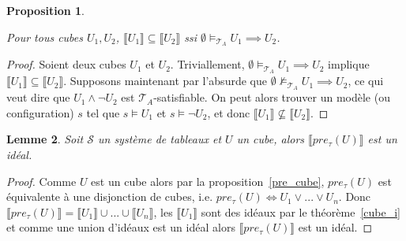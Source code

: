 \documentclass[a4paper, twoside]{scrartcl}
\theoremstyle{plain}%
\newtheorem{thm}{Théorème}[section]
\newtheorem{lem}[thm]{Lemme}
\newtheorem{prop}[thm]{Proposition}
\theoremstyle{definition}
\theoremstyle{remark}
\begin{document}
\begin{prop} \label{cube_incl} 

  Pour tous cubes $U_1, U_2$, $\llbracket U_1 \rrbracket \subseteq
  \llbracket U_2 \rrbracket$ ssi $\emptyset \vDash_{\mathcal{T}_A} U_1
  \implies U_2$.

\end{prop}


\begin{proof}

  Soient deux cubes $U_1$ et $U_2$. Triviallement, $\emptyset
  \vDash_{\mathcal{T}_A} U_1 \implies U_2$ implique $\llbracket U_1
  \rrbracket \subseteq \llbracket U_2 \rrbracket$. Supposons
  maintenant par l'absurde que $\emptyset \not \vDash_{\mathcal{T}_A} U_1
  \implies U_2$, ce qui veut dire que $U_1 \land \neg U_2$ est
  $\mathcal{T}_A$-satisfiable. On peut alors trouver un modèle (ou
  configuration) $s$ tel que $s \vDash U_1$ et $s \vDash \neg U_2$,
  et donc $\llbracket U_1 \rrbracket \not \subseteq \llbracket U_2
  \rrbracket$.

\end{proof}


\begin{lem} \label{pre_i}
  Soit $\mathcal{S}$ un système de tableaux et $U$ un cube, alors
  $\llbracket pre_\tau(U) \rrbracket$ est un idéal.
\end{lem}

\begin{proof}
  Comme $U$ est un cube alors par la proposition~\ref{pre_cube},
  $pre_\tau(U)$ est équivalente à une disjonction de cubes,
  i.e. $pre_\tau(U) \iff U_1 \vee ... \vee U_n $. Donc $\llbracket
  pre_\tau(U) \rrbracket = \llbracket U_1 \rrbracket \cup ... \cup
  \llbracket U_n \rrbracket $, les $\llbracket U_1 \rrbracket$ sont
  des idéaux par le théorème~\ref{cube_i} et comme une union
  d'idéaux est un idéal alors $\llbracket pre_\tau(U) \rrbracket$ est
  un idéal.
\end{proof}


\end{document}
